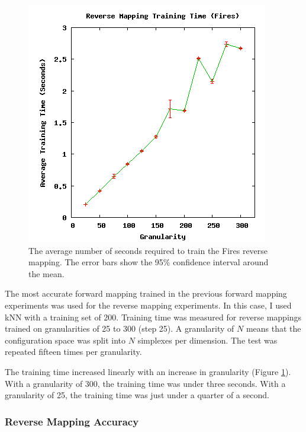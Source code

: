 \begin{figure}[ht]
\centering
\includegraphics[scale=.5]{images/results_fires/rmtraining.png}
\caption{The average number of seconds required to train the Fires reverse mapping.
The error bars show the 95\% confidence interval around the mean.}
\label{fig:rmtraining}
\end{figure}

The most accurate forward mapping trained in the previous forward mapping experiments was used for the reverse mapping experiments.
In this case, I used kNN with a training set of 200.
Training time was measured for reverse mappings trained on granularities of 25 to 300 (step 25).
A granularity of $N$ means that the configuration space was split into $N$ simplexes per dimension.
The test was repeated fifteen times per granularity.

The training time increased linearly with an increase in granularity (Figure \ref{fig:rmtraining}).
With a granularity of 300, the training time was under three seconds.
With a granularity of 25, the training time was just under a quarter of a second.


\subsubsection{Reverse Mapping Accuracy}

